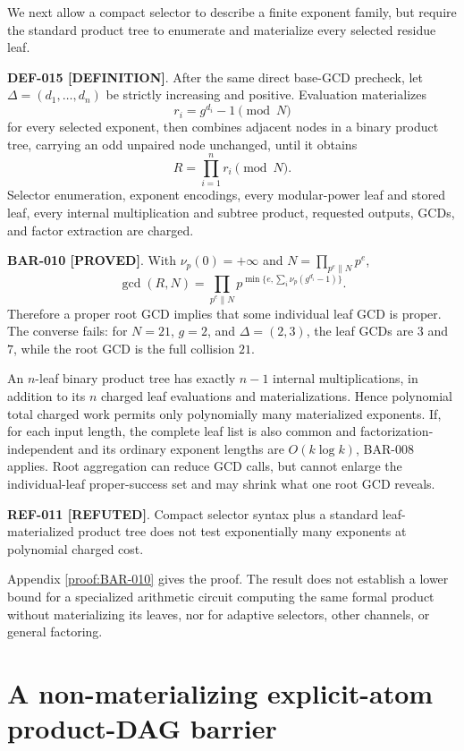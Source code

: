 \documentclass[11pt]{article}
\newcommand{\claimstatus}[2]{\textbf{#1 [#2]}}
\begin{document}
We next allow a compact selector to describe a finite exponent family, but
require the standard product tree to enumerate and materialize every selected
residue leaf.

\claimstatus{DEF-015}{DEFINITION}. After the same direct base-GCD precheck,
let \(\Delta=(d_1,\ldots,d_n)\) be strictly increasing and positive. Evaluation
materializes
\[
r_i=g^{d_i}-1\pmod N
\]
for every selected exponent, then combines adjacent nodes in a binary product
tree, carrying an odd unpaired node unchanged, until it obtains
\[
R=\prod_{i=1}^n r_i\pmod N.
\]
Selector enumeration, exponent encodings, every modular-power leaf and stored
leaf, every internal multiplication and subtree product, requested outputs,
GCDs, and factor extraction are charged.

\claimstatus{BAR-010}{PROVED}. With \(\nu_p(0)=+\infty\) and
\(N=\prod_{p^e\parallel N}p^e\),
\[
\gcd(R,N)=
\prod_{p^e\parallel N}
p^{\min\{e,\sum_i\nu_p(g^{d_i}-1)\}}.
\]
Therefore a proper root GCD implies that some individual leaf GCD is proper.
The converse fails: for \(N=21\), \(g=2\), and
\(\Delta=(2,3)\), the leaf GCDs are \(3\) and \(7\), while the root GCD is
the full collision \(21\).

An \(n\)-leaf binary product tree has exactly \(n-1\) internal
multiplications, in addition to its \(n\) charged leaf evaluations and
materializations. Hence polynomial total charged work permits only
polynomially many materialized exponents. If, for each input length, the
complete leaf list is also common and factorization-independent and its
ordinary exponent lengths are \(O(k\log k)\), BAR-008 applies. Root
aggregation can reduce GCD calls, but cannot enlarge the individual-leaf
proper-success set and may shrink what one root GCD reveals.

\claimstatus{REF-011}{REFUTED}. Compact selector syntax plus a standard
leaf-materialized product tree does not test exponentially many exponents at
polynomial charged cost.

Appendix \ref{proof:BAR-010} gives the proof. The result does not establish a
lower bound for a specialized arithmetic circuit computing the same formal
product without materializing its leaves, nor for adaptive selectors, other
channels, or general factoring.

\section{A non-materializing explicit-atom product-DAG barrier}
\end{document}
